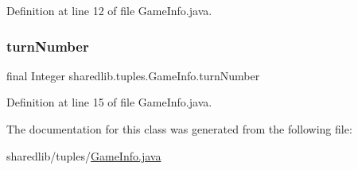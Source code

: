 Definition at line 12 of file Game\+Info.\+java.

\hypertarget{classsharedlib_1_1tuples_1_1_game_info_a71de1ad6ea2bfc9eb4b498c57b04c55c}{}\label{classsharedlib_1_1tuples_1_1_game_info_a71de1ad6ea2bfc9eb4b498c57b04c55c} 
\subsubsection{\texorpdfstring{turn\+Number}{turnNumber}}
{\footnotesize\ttfamily final Integer sharedlib.\+tuples.\+Game\+Info.\+turn\+Number}



Definition at line 15 of file Game\+Info.\+java.



The documentation for this class was generated from the following file\+:\begin{DoxyCompactItemize}
\item 
sharedlib/tuples/\hyperlink{_game_info_8java}{Game\+Info.\+java}\end{DoxyCompactItemize}
